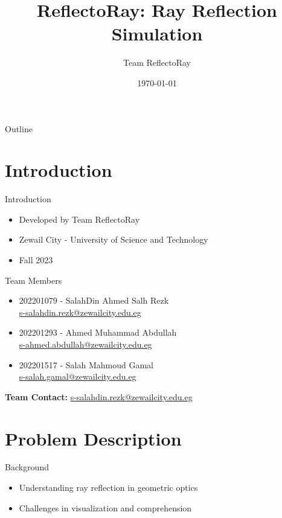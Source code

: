 \documentclass{beamer}
\title{ReflectoRay: Ray Reflection Simulation}
\author{Team ReflectoRay}
\date{\today}
\begin{document}
\begin{frame}
  \titlepage
\end{frame}

\begin{frame}{Outline}
  \tableofcontents
\end{frame}

\section{Introduction}
\begin{frame}{Introduction}
  \begin{itemize}
    \item Developed by Team ReflectoRay
    \item Zewail City - University of Science and Technology
    \item Fall 2023
  \end{itemize}
\end{frame}

\begin{frame}{Team Members}
  \begin{itemize}
    \item 202201079 - SalahDin Ahmed Salh Rezk \\
          \href{mailto:s-salahdin.rezk@zewailcity.edu.eg}{s-salahdin.rezk@zewailcity.edu.eg}
    \item 202201293 - Ahmed Muhammad Abdullah \\
          \href{mailto:s-ahmed.abdullah@zewailcity.edu.eg}{s-ahmed.abdullah@zewailcity.edu.eg}
    \item 202201517 - Salah Mahmoud Gamal \\
          \href{mailto:s-salah.gamal@zewailcity.edu.eg}{s-salah.gamal@zewailcity.edu.eg}
  \end{itemize}
  \textbf{Team Contact:} \href{mailto:s-salahdin.rezk@zewailcity.edu.eg}{s-salahdin.rezk@zewailcity.edu.eg}
\end{frame}

\section{Problem Description}
\begin{frame}{Background}
  \begin{itemize}
    \item Understanding ray reflection in geometric optics
    \item Challenges in visualization and comprehension
  \end{itemize}
\end{frame}
\end{document}
